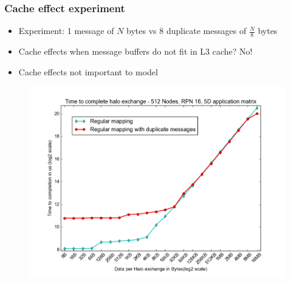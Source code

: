\documentclass{beamer}
\begin{document}
\begin{frame}
\frametitle{Cache effect experiment}
\begin{itemize}
    \item Experiment: 1 message of $N$ bytes vs 8 duplicate messages of $\frac{N}{8}$ bytes
    \item Cache effects when message buffers do not fit in L3 cache? No!
    \item Cache effects not important to model
\end{itemize}
\begin{figure}
\includegraphics[width=0.6\linewidth]{../cache_duplicates_vs_regular.png}
\end{figure}
\end{frame}
\end{document}
